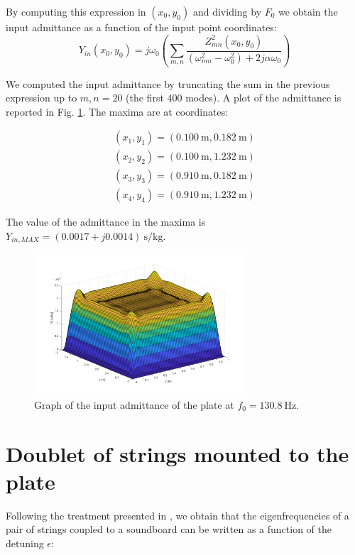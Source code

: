 \documentclass[a4paper]{article}
\begin{document}
By computing this expression in $(x_0, y_0)$ and dividing by $F_0$ we obtain the input admittance as a function of the input point coordinates:
$$ Y_{in}(x_0, y_0) =  j\omega_0 \left( \sum_{m,n} \frac{Z_{mn}^2(x_0, y_0)}{(\omega_{mn}^2 - \omega_0^2) + 2j\alpha \omega_0} \right)$$

We computed the input admittance by truncating the sum in the previous expression up to $m, n = 20$ (the first 400 modes). A plot of the admittance is reported in Fig. \ref{fig:adm}. The maxima are at coordinates:

\begin{align*}
	(x_1, y_1) = (\SI{0.100}{\metre}, \SI{0.182}{\meter}) \\
	(x_2, y_2) = (\SI{0.100}{\metre}, \SI{1.232}{\meter}) \\
	(x_3, y_3) = (\SI{0.910}{\metre}, \SI{0.182}{\meter}) \\
	(x_4, y_4) = (\SI{0.910}{\metre}, \SI{1.232}{\meter})
\end{align*}

The value of the admittance in the maxima is $Y_{in, MAX} = (0.0017 + j0.0014)~\si{\second\per\kilogram}$.

\begin{figure}[h]
	\centering
	\includegraphics[width=0.7\textwidth]{admittance.png}
	\caption{Graph of the input admittance of the plate at $f_0 = \SI{130.8}{\hertz}$.}
	\label{fig:adm}
\end{figure}

\section{Doublet of strings mounted to the plate}

Following the treatment presented in \cite{chker}, we obtain that the eigenfrequencies of a pair of strings coupled to a soundboard can be written as a function of the detuning $\epsilon$:
\end{document}
